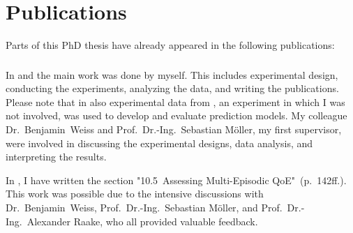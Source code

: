 \chapter*{Publications}
Parts of this PhD thesis have already appeared in the following publications:

\begin{refsection}
    \small
    \nocite{guse_macro-temporal_2013}
    \nocite{guse_modelling_2014}
    \nocite{weiss_temporal_2014}
    \printbibliography[heading=none]
\end{refsection}

\subsection*{}
In \citet{guse_macro-temporal_2013} and \citet{guse_modelling_2014} the main work was done by myself.
This includes experimental design, conducting the experiments, analyzing the data, and writing the publications.
Please note that in \citet{guse_modelling_2014} also experimental data from \citet{moller_single-call_2011}, an experiment in which I was not involved, was used to develop and evaluate prediction models.
My colleague Dr.~Benjamin~Weiss and Prof.~Dr.-Ing.~Sebastian Möller, my first supervisor, were involved in discussing the experimental designs, data analysis, and interpreting the results.

In \citet{weiss_temporal_2014}, I have written the section "10.5~Assessing Multi-Episodic QoE"~(p.~142ff.).
This work was possible due to the intensive discussions with Dr.~Benjamin~Weiss, Prof.~Dr.-Ing.~Sebastian Möller, and Prof.~Dr.-Ing.~Alexander Raake, who all provided valuable feedback.